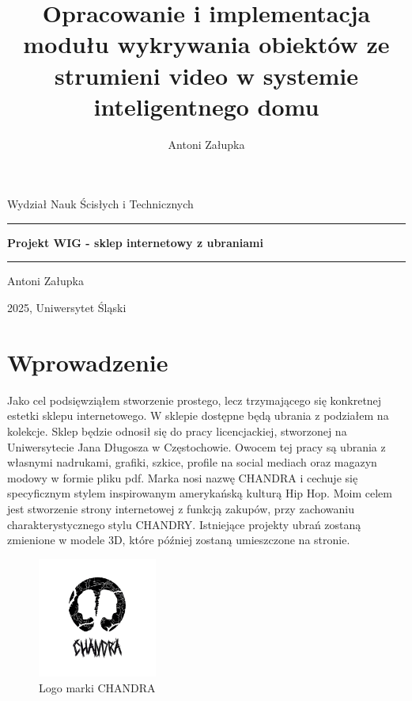 \documentclass[14pt]{extarticle}
\title{Opracowanie i implementacja modułu wykrywania obiektów ze strumieni video w systemie inteligentnego domu}
\author{Antoni Załupka}
\begin{document}
	\thispagestyle{empty}
	
	\begin{center}
		\Large{Wydział Nauk Ścisłych i Technicznych}
	\end{center}
	
	\vspace{2cm}
	
	\rule{\linewidth}{2mm} 
	
	\begin{center}
		\huge \textbf{Projekt WIG - sklep internetowy z ubraniami} \\
	\end{center}
	
	\rule{\linewidth}{0.5mm} 
	
	\vspace{2cm}
	
	\begin{center}
		\Large{Antoni Załupka}
	\end{center}
	
	\vspace{1.5cm}
	
	
	
	\vspace{8cm}
	
	\begin{center}
		\Large{2025, Uniwersytet Śląski}
	\end{center}
	
	\newpage
	
	\section{Wprowadzenie}
		Jako cel podsięwziąłem stworzenie prostego, lecz trzymającego się konkretnej estetki sklepu internetowego. W sklepie dostępne będą ubrania z podziałem na kolekcje. Sklep będzie odnosił się do pracy licencjackiej, stworzonej na Uniwersytecie Jana Długosza w Częstochowie. Owocem tej pracy są ubrania z własnymi nadrukami, grafiki, szkice, profile na social mediach oraz magazyn modowy w formie pliku pdf. Marka nosi nazwę CHANDRA i cechuje się specyficznym stylem inspirowanym amerykańską kulturą Hip Hop. Moim celem jest stworzenie strony internetowej z funkcją zakupów, przy zachowaniu charakterystycznego stylu CHANDRY. Istniejące projekty ubrań zostaną zmienione w modele 3D, które później zostaną umieszczone na stronie.
		
		\begin{figure}[h]
			\centering
			\includegraphics[width=0.35\textwidth]{chandra-logo.png}
			\caption{Logo marki CHANDRA}
		\end{figure}
\end{document}
